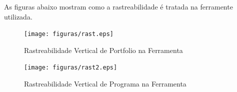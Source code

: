 As figuras abaixo mostram como a rastreabilidade é tratada na ferramente utilizada.

\begin{figure}[H]
    \centering
	\texttt{[image: figuras/rast.eps]}
    \caption{ Rastreabilidade Vertical de Portfolio na Ferramenta}
    \label{fig:ras}
\end{figure}

\begin{figure}[H]
    \centering
	\texttt{[image: figuras/rast2.eps]}
    \caption{Rastreabilidade Vertical de Programa na Ferramenta}
    \label{fig:ras2}
\end{figure}
